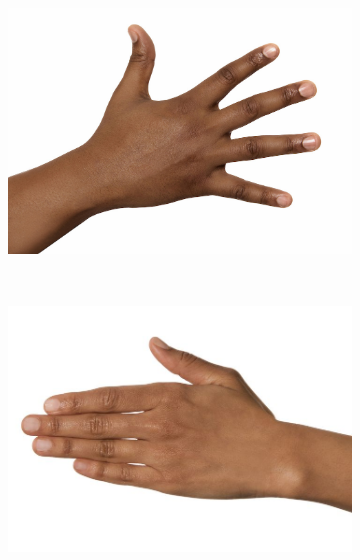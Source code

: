 \begin{figure}[H]
    \centering
    \begin{subfigure}[b]{0.20\textwidth}
        \includegraphics[width=\textwidth]{images/hand_dark}
        \caption{}\label{img:input_hands_1_dark}
    \end{subfigure}
    ~
    \begin{subfigure}[b]{0.20\textwidth}
        \includegraphics[width=\textwidth]{images/hand_brown}
        \caption{}\label{img:input_hands_1_brown}
    \end{subfigure}
    ~
    \begin{subfigure}[b]{0.20\textwidth}

\end{subfigure}
\end{figure}
